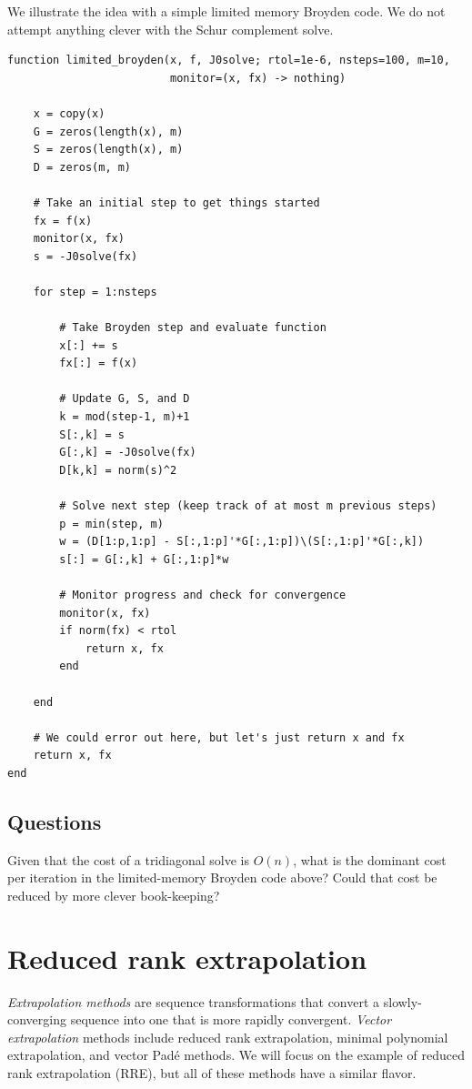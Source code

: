 \documentclass[12pt, leqno]{article} %
\begin{document}
We illustrate the idea with a simple limited memory Broyden code. We do
not attempt anything clever with the Schur complement solve.

\begin{verbatim}
function limited_broyden(x, f, J0solve; rtol=1e-6, nsteps=100, m=10, 
                         monitor=(x, fx) -> nothing)

    x = copy(x)
    G = zeros(length(x), m)
    S = zeros(length(x), m)
    D = zeros(m, m)

    # Take an initial step to get things started
    fx = f(x)
    monitor(x, fx)
    s = -J0solve(fx)
    
    for step = 1:nsteps
        
        # Take Broyden step and evaluate function
        x[:] += s
        fx[:] = f(x)
        
        # Update G, S, and D
        k = mod(step-1, m)+1
        S[:,k] = s
        G[:,k] = -J0solve(fx)
        D[k,k] = norm(s)^2
        
        # Solve next step (keep track of at most m previous steps)
        p = min(step, m)
        w = (D[1:p,1:p] - S[:,1:p]'*G[:,1:p])\(S[:,1:p]'*G[:,k])
        s[:] = G[:,k] + G[:,1:p]*w

        # Monitor progress and check for convergence
        monitor(x, fx)
        if norm(fx) < rtol
            return x, fx
        end

    end
    
    # We could error out here, but let's just return x and fx
    return x, fx
end
\end{verbatim}

\subsection{Questions}

Given that the cost of a tridiagonal solve is \(O(n)\), what is the
dominant cost per iteration in the limited-memory Broyden code above?
Could that cost be reduced by more clever book-keeping?

\section{Reduced rank extrapolation}

\emph{Extrapolation methods} are sequence transformations that convert a
slowly-converging sequence into one that is more rapidly convergent.
\emph{Vector extrapolation} methods include reduced rank extrapolation,
minimal polynomial extrapolation, and vector Padé methods. We will focus
on the example of reduced rank extrapolation (RRE), but all of these
methods have a similar flavor.
\end{document}
